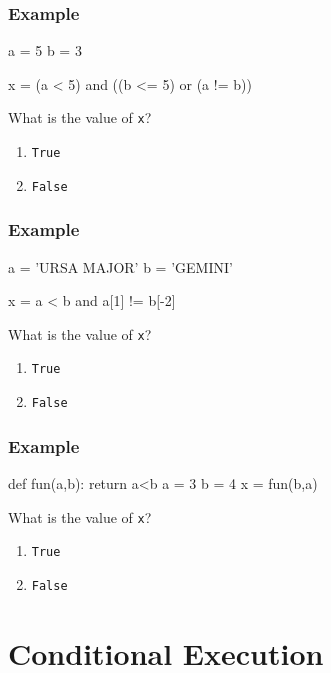 \documentclass[11pt]{beamer}
\begin{document}
\begin{frame}[fragile]
  \frametitle{Example}
  \Enlarge

  \begin{semiverbatim}
a = 5
b = 3

x = (a < 5) and ((b <= 5) or (a != b))
  \end{semiverbatim}
  What is the value of \texttt{x}?
  \begin{enumerate}[label=\Alph*]
  \item  \texttt{True}
  \item  \texttt{False}
  \end{enumerate}
\end{frame}

\begin{frame}[fragile]
  \frametitle{Example}
  \Enlarge

  \begin{semiverbatim}
a = 'URSA MAJOR'
b = 'GEMINI'

x = a < b and a[1] != b[-2]
  \end{semiverbatim}
  What is the value of \texttt{x}?
  \begin{enumerate}[label=\Alph*]
  \item  \texttt{True}
  \item  \texttt{False}
  \end{enumerate}
\end{frame}

\begin{frame}[fragile]
  \frametitle{Example}
  \Enlarge

  \begin{semiverbatim}
def fun(a,b):
    return a<b
a = 3
b = 4
x = fun(b,a)
  \end{semiverbatim}
  What is the value of \texttt{x}?
  \begin{enumerate}[label=\Alph*]
  \item  \texttt{True}
  \item  \texttt{False}
  \end{enumerate}
\end{frame}

\section{Conditional Execution}
\end{document}
